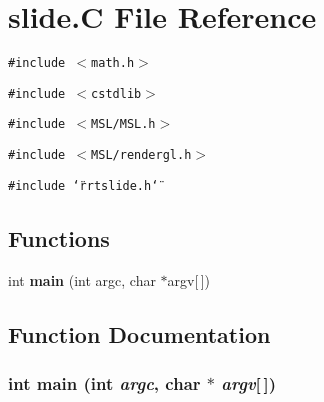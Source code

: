 \section{slide.C File Reference}
\label{slide_8C}
{\tt \#include $<$math.h$>$}\par
{\tt \#include $<$cstdlib$>$}\par
{\tt \#include $<$MSL/MSL.h$>$}\par
{\tt \#include $<$MSL/rendergl.h$>$}\par
{\tt \#include \char`\"{}rrtslide.h\char`\"{}}\par
\subsection*{Functions}
\begin{CompactItemize}
\item 
int {\bf main} (int argc, char $\ast$argv[$\,$])
\end{CompactItemize}


\subsection{Function Documentation}
\subsubsection{\setlength{\rightskip}{0pt plus 5cm}int main (int {\em argc}, char $\ast$ {\em argv}[$\,$])}\label{slide_8C_a0}


